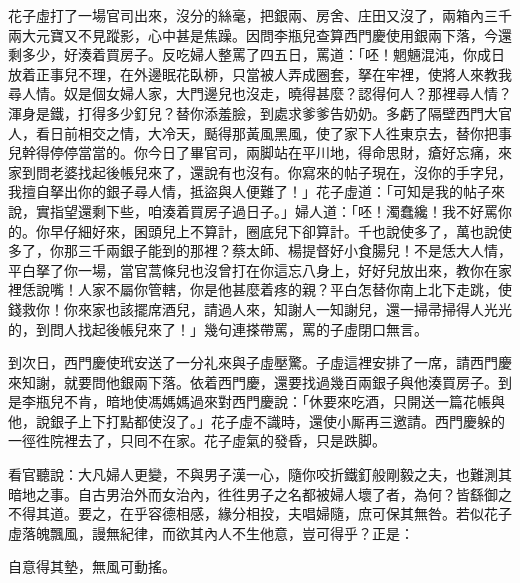 花子虛打了一場官司出來，沒分的絲毫，把銀兩、房舍、庄田又沒了，兩箱內三千兩大元寶又不見蹤影，心中甚是焦躁。因問李瓶兒查算西門慶使用銀兩下落，今還剩多少，好湊着買房子。反吃婦人整罵了四五日，罵道：「呸！魍魎混沌，{}你成日放着正事兒不理，在外邊眠花臥桺，只當被人弄成圈套，拏在牢裡，使將人來教我尋人情。奴是個女婦人家，大門邊兒也沒走，曉得甚麼？認得何人？那裡尋人情？渾身是鐵，打得多少釘兒？替你添羞臉，到處求爹爹告奶奶。多虧了隔壁西門大官人，{}看日前相交之情，大冷天，颳得那黃風黑風，使了家下人徃東京去，替你把事兒幹得停停當當的。你今日了畢官司，兩脚站在平川地，得命思財，瘡好忘痛，來家到問老婆找起後帳兒來了，還說有也沒有。你寫來的帖子現在，沒你的手字兒，我擅自拏出你的銀子尋人情，抵盜與人便難了！」{}{}花子虛道：「可知是我的帖子來說，{}實指望還剩下些，咱湊着買房子過日子。」婦人道：「呸！濁蠢纔！我不好罵你的。你早仔細好來，囷頭兒上不算計，圈底兒下卻算計。千也說使多了，萬也說使多了，你那三千兩銀子能到的那裡？蔡太師、楊提督好小食腸兒！不是恁大人情，平白拏了你一場，當官蒿條兒也沒曾打在你這忘八身上，好好兒放出來，教你在家裡恁說嘴！人家不屬你管轄，你是他甚麼着疼的親？平白怎替你南上北下走跳，使錢救你！你來家也該擺席酒兒，請過人來，知謝人一知謝兒，還一掃帚掃得人光光的，到問人找起後帳兒來了！」幾句連搽帶罵，罵的子虛閉口無言。

到次日，西門慶使玳安送了一分礼來與子虛壓驚。子虛這裡安排了一席，請西門慶來知謝，就要問他銀兩下落。依着西門慶，還要找過幾百兩銀子與他湊買房子。到是李瓶兒不肯，{}暗地使馮媽媽過來對西門慶說：「休要來吃酒，只開送一篇花帳與他，說銀子上下打點都使沒了。」花子虛不識時，還使小厮再三邀請。西門慶躲的一徑徃院裡去了，只囘不在家。花子虛氣的發昏，只是跌脚。

看官聽說：大凡婦人更變，不與男子漢一心，隨你咬折鐵釘般剛毅之夫，也難測其暗地之事。自古男治外而女治內，徃徃男子之名都被婦人壞了者，為何？皆繇御之不得其道。要之，在乎容德相感，緣分相投，夫唱婦隨，庶可保其無咎。若似花子虛落魄飄風，謾無紀律，而欲其內人不生他意，豈可得乎？正是：

\begin{myquote}
自意得其墊，無風可動搖。
\end{myquote}

